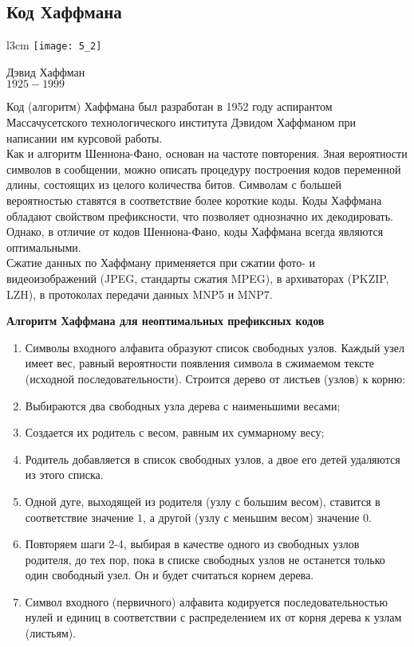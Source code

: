 \subsection{Код Хаффмана}
\begin{wrapfigure}[14]{l}{3cm}
\texttt{[image: 5\_2]}
\begin{center}
\footnotesize{Дэвид Хаффман}
\\\footnotesize{$1925 - 1999$}
\end{center}
\end{wrapfigure}
Код (алгоритм) Хаффмана был разработан в 1952 году аспирантом Массачусетского технологического института Дэвидом Хаффманом при написании им курсовой работы.
\\Как и алгоритм Шеннона-Фано, основан на частоте повторения. Зная вероятности символов в сообщении, можно описать процедуру построения кодов переменной длины, состоящих из целого количества битов. Символам с большей вероятностью ставятся в соответствие более короткие коды. Коды Хаффмана обладают свойством префиксности, что позволяет однозначно их декодировать.
\\Однако, в отличие от кодов Шеннона-Фано, коды Хаффмана всегда являются оптимальными.
\\Сжатие данных по Хаффману применяется при сжатии фото- и видеоизображений (JPEG, стандарты сжатия MPEG), в архиваторах (PKZIP, LZH), в протоколах передачи данных MNP5 и MNP7.
\begin{center}
  \textbf{Алгоритм Хаффмана для неоптимальных префиксных кодов}
\end{center}

\begin{enumerate}
  \item Символы входного алфавита образуют список свободных узлов. Каждый узел имеет вес, равный вероятности появления символа в сжимаемом тексте (исходной последовательности). Строится дерево от листьев (узлов) к корню:
  \item Выбираются два свободных узла дерева с наименьшими весами;
  \item Создается их родитель с весом, равным их суммарному весу;
  \item Родитель добавляется в список свободных узлов, а двое его детей удаляются из этого списка.
  \item Одной дуге, выходящей из родителя (узлу с большим весом), ставится в соответствие значение $1$, а другой (узлу с меньшим весом) значение $0$.
  \item Повторяем шаги 2-4, выбирая в качестве одного из свободных узлов родителя, до тех пор, пока в списке свободных узлов не останется только один свободный узел. Он и будет считаться корнем дерева.
  \item Символ входного (первичного) алфавита кодируется последовательностью нулей и единиц в соответствии с распределением их от корня дерева к узлам (листьям).
\end{enumerate}

